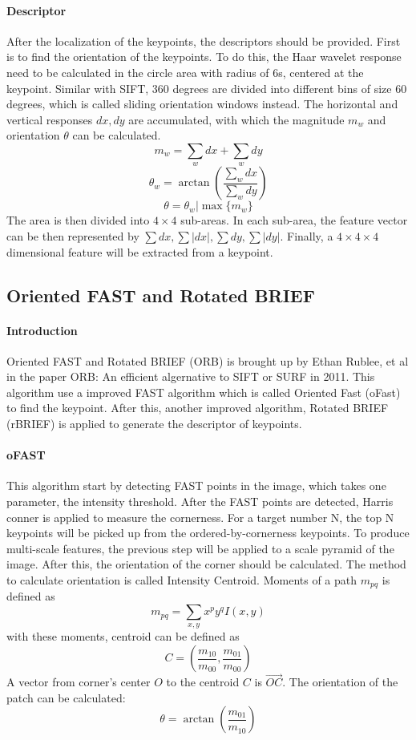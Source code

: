 \documentclass[paper=a4, fontsize=11pt]{scrartcl} %
\numberwithin{equation}{section} %
\numberwithin{figure}{section} %
\numberwithin{table}{section} %
\begin{document}
\paragraph{Descriptor}
After the localization of the keypoints, the descriptors should be provided. First is to find the orientation of the keypoints. 
To do this, the Haar wavelet response need to be calculated in the circle area with radius of 6s, centered at the keypoint. 
Similar with SIFT, 360 degrees are divided into different bins of size 60 degrees, which is called sliding orientation windows instead.
The horizontal and vertical responses $dx, dy$ are accumulated, with which the magnitude $m_w$ and orientation $\theta$ can be calculated.
$$
m_w = \sum_w dx + \sum_w dy
$$
$$
\theta_w = \arctan(\frac{\sum_w dx}{\sum_w dy})
$$
$$
\theta = \theta_w | \max{\{m_w\}}
$$
The area is then divided into $4\times4$ sub-areas.
In each sub-area, the feature vector can be then represented by $\sum dx, \sum|dx|, \sum dy, \sum |dy|$.
Finally, a $4\times4\times4$ dimensional feature will be extracted from a keypoint.



\subsection{Oriented FAST and Rotated BRIEF}

\paragraph{Introduction}
Oriented FAST and Rotated BRIEF (ORB) is brought up by Ethan Rublee, et al in the paper ORB: An efficient algernative to SIFT or SURF in 2011.
This algorithm use a improved FAST algorithm which is called Oriented Fast (oFast) to find the keypoint. 
After this, another improved algorithm, Rotated BRIEF (rBRIEF) is applied to generate the descriptor of keypoints.

\paragraph{oFAST}
This algorithm start by detecting FAST points in the image, which takes one parameter, the intensity threshold. 
After the FAST points are detected, Harris conner is applied to measure the cornerness. 
For a target number N, the top N keypoints will be picked up from the ordered-by-cornerness keypoints.
To produce multi-scale features, the previous step will be applied to a scale pyramid of the image.
After this, the orientation of the corner should be calculated.
The method to calculate orientation is called Intensity Centroid.
Moments of a path $m_{pq}$ is defined as
$$
m_{pq} = \sum_{x, y} x^p y^q I(x, y)
$$
with these moments, centroid can be defined as
$$
C = \left( \frac{m_{10}} {m_{00} }, \frac{m_{01}} {m_{00}} \right)
$$
A vector from corner's center $O$ to the centroid $C$ is $\overrightarrow{OC}$. 
The orientation of the patch can be calculated:
$$
\theta = \arctan(\frac{m_{01}}{m_{10}})
$$
\end{document}
